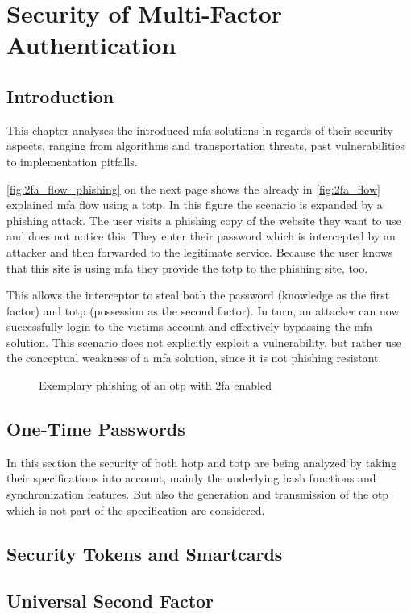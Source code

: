 \chapter{Security of Multi-Factor Authentication}

\section{Introduction}

This chapter analyses the introduced \gls{mfa} solutions in regards of their security aspects, ranging from algorithms and transportation threats, past vulnerabilities to implementation pitfalls.

\autoref{fig:2fa_flow_phishing} on the next page shows the already in \autoref{fig:2fa_flow} explained \gls{mfa} flow using a \gls{totp}. In this figure the scenario is expanded by a phishing attack. The user visits a phishing copy of the website they want to use and does not notice this. They enter their password which is intercepted by an attacker and then forwarded to the legitimate service. Because the user knows that this site is using \gls{mfa} they provide the \gls{totp} to the phishing site, too.

This allows the interceptor to steal both the password (knowledge as the first factor) and \gls{totp} (possession as the second factor). In turn, an attacker can now successfully login to the victims account and effectively bypassing the \gls{mfa} solution. This scenario does not explicitly exploit a vulnerability, but rather use the conceptual weakness of a \gls{mfa} solution, since it is not phishing resistant.

\newpage

\begin{figure}[hbt]
	\centering
	
	\caption[Exemplary phishing of an \gls{otp} with \gls{2fa} enabled]{Exemplary phishing of an \gls{otp} with \gls{2fa} enabled\footnotemark}
	\label{fig:2fa_flow_phishing}
\end{figure}

\section{One-Time Passwords}
\label{sec:totp_sec}

In this section the security of both \gls{hotp} and \gls{totp} are being analyzed by taking their specifications into account, mainly the underlying hash functions and synchronization features. But also the generation and transmission of the \gls{otp} which is not part of the specification are considered.



\section{Security Tokens and Smartcards}
\label{sec:tokens}



\section{Universal Second Factor}
\label{sec:u2f}


